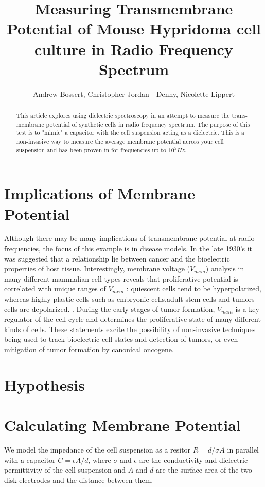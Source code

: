 \documentclass[journal]{IEEEtran}
\title{Measuring Transmembrane Potential of Mouse Hypridoma cell culture in Radio Frequency Spectrum}
\author{Andrew Bossert, Christopher Jordan - Denny, Nicolette Lippert}
\begin{document}
\maketitle

\begin{abstract}
This article explores using dielectric spectroscopy in an attempt to measure the trans-membrane potential of synthetic cells in radio frequency spectrum. The purpose of this test is to "mimic" a capacitor with the cell suspension acting as a dielectric. This is a non-invasive way to measure the average membrane potential across your cell suspension and has been proven in \cite{Dielectric Spectroscopy} for frequencies up to \textbf{$10^5 Hz$}.
\end{abstract}

\section{Implications of Membrane Potential}
Although there may be many implications of transmembrane potential at radio frequencies, the focus of this example is in disease models. In the late 1930's it was suggested that a relationship lie between cancer and the bioelectric properties of host tissue. Interestingly, membrane voltage ($V_{mem}$) analysis in many different mammalian cell types reveals that proliferative potential is correlated with unique ranges of $V_{mem}$ : quiescent cells tend to be hyperpolarized, whereas highly plastic cells such as embryonic cells,adult stem cells and tumors cells are depolarized. \cite{TMP-implications}. During the early stages of tumor formation, $V_{mem}$ is a key regulator of the cell cycle and determines the proliferative state of many different kinds of cells. These statements excite the possibility of non-invasive techniques being used to track bioelectric cell states and detection of tumors, or even mitigation of tumor formation by canonical oncogene.

\section{Hypothesis}


\section{Calculating Membrane Potential}
We model the impedance of the cell suspension as a resitor $R = d/\sigma A$ in parallel with a capacitor $C = \epsilon A/d$, where $\sigma$ and $\epsilon$ are the conductivity and dielectric permittivity of the cell suspension and $A$ and $d$ are the surface area of the two disk electrodes and the distance between them. 
\end{document}
